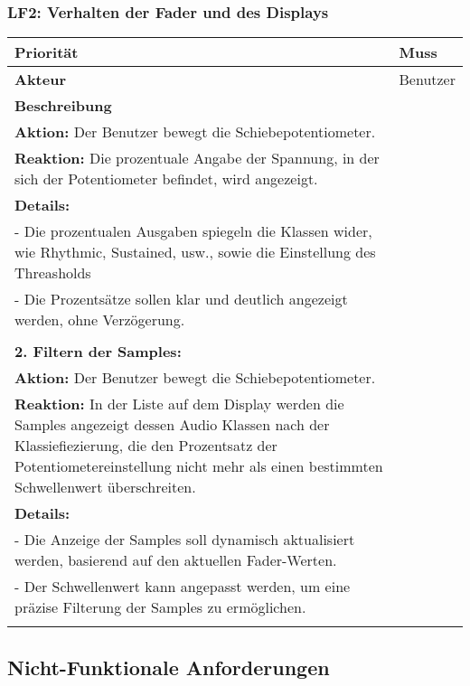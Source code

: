 \newpage
\subsubsection{LF2: Verhalten der Fader und des Displays}

\begin{longtable}[c]{|p{3cm}|p{13cm}|}
\hline
\textbf{Priorität} & Muss \\
\hline
\textbf{Akteur} & Benutzer \\
\hline
\textbf{Beschreibung} & 
\begin{tabularx}{13cm}{X}
\textbf{1. Anzeige der Fader-Werte:} \\
\textbf{Aktion:} Der Benutzer bewegt die Schiebepotentiometer. \\
\textbf{Reaktion:} Die prozentuale Angabe der Spannung, in der sich der Potentiometer befindet, wird angezeigt. \\
\textbf{Details:} \\
- Die prozentualen Ausgaben spiegeln die Klassen wider, wie Rhythmic, Sustained, usw., sowie die Einstellung des Threasholds \\
- Die Prozentsätze sollen klar und deutlich angezeigt werden, ohne Verzögerung. \\
\\
\textbf{2. Filtern der Samples:} \\
\textbf{Aktion:} Der Benutzer bewegt die Schiebepotentiometer. \\
\textbf{Reaktion:} In der Liste auf dem Display werden die Samples angezeigt dessen Audio Klassen nach der Klassiefiezierung, die den Prozentsatz der Potentiometereinstellung nicht mehr als einen bestimmten Schwellenwert überschreiten. \\
\textbf{Details:} \\
- Die Anzeige der Samples soll dynamisch aktualisiert werden, basierend auf den aktuellen Fader-Werten. \\
- Der Schwellenwert kann angepasst werden, um eine präzise Filterung der Samples zu ermöglichen. \\
\end{tabularx} \\
\hline
\end{longtable}

\newpage
\subsection{Nicht-Funktionale Anforderungen}

